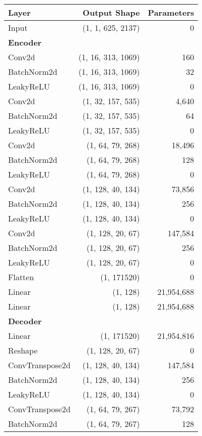 \begin{table}[!h]
    \centering
    \begin{tabular}{lrr}
        \toprule
        Layer & Output Shape & Parameters \\
        \midrule
        Input & (1, 1, 625, 2137) & 0 \\
        \multicolumn{3}{l}{\textbf{Encoder}} \\
        Conv2d & (1, 16, 313, 1069) & 160 \\
        BatchNorm2d & (1, 16, 313, 1069) & 32 \\
        LeakyReLU & (1, 16, 313, 1069) & 0 \\
        Conv2d & (1, 32, 157, 535) & 4,640 \\
        BatchNorm2d & (1, 32, 157, 535) & 64 \\
        LeakyReLU & (1, 32, 157, 535) & 0 \\
        Conv2d & (1, 64, 79, 268) & 18,496 \\
        BatchNorm2d & (1, 64, 79, 268) & 128 \\
        LeakyReLU & (1, 64, 79, 268) & 0 \\
        Conv2d & (1, 128, 40, 134) & 73,856 \\
        BatchNorm2d & (1, 128, 40, 134) & 256 \\
        LeakyReLU & (1, 128, 40, 134) & 0 \\
        Conv2d & (1, 128, 20, 67) & 147,584 \\
        BatchNorm2d & (1, 128, 20, 67) & 256 \\
        LeakyReLU & (1, 128, 20, 67) & 0 \\
        Flatten & (1, 171520) & 0 \\
        Linear  & (1, 128) & 21,954,688 \\
        Linear & (1, 128) & 21,954,688 \\
        \multicolumn{3}{l}{\textbf{Decoder}} \\
        Linear & (1, 171520) & 21,954,816 \\
        Reshape & (1, 128, 20, 67) & 0 \\
        ConvTranspose2d & (1, 128, 40, 134) & 147,584 \\
        BatchNorm2d & (1, 128, 40, 134) & 256 \\
        LeakyReLU & (1, 128, 40, 134) & 0 \\
        ConvTranspose2d & (1, 64, 79, 267) & 73,792 \\
        BatchNorm2d & (1, 64, 79, 267) & 128 \\

\end{tabular}
\end{table}
